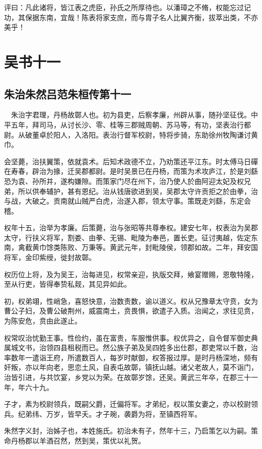 \documentclass[12pt,UTF8]{ctexbook}
\begin{document}
评曰：凡此诸将，皆江表之虎臣，孙氏之所厚待也。以潘璋之不脩，权能忘过记功，其保据东南，宜哉！陈表将家支庶，而与胄子名人比翼齐衡，拔萃出类，不亦美乎！

\part{吴书十一}
\chapter{朱治朱然吕范朱桓传第十一}

　朱治字君理，丹杨故鄣人也。初为县吏，后察孝廉，州辟从事，随孙坚征伐。中平五年，拜司马，从讨长沙、零、桂等三郡贼周朝、苏马等，有功，坚表治行都尉。从破董卓於阳人，入洛阳。表治行督军校尉，特将步骑，东助徐州牧陶谦讨黄巾。

会坚薨，治扶翼策，依就袁术。后知术政德不立，乃劝策还平江东。时太傅马日磾在寿春，辟治为掾，迁吴郡都尉。是时吴景已在丹杨，而策为术攻庐江，於是刘繇恐为袁、孙所并，遂构嫌隙。而策家门尽在州下，治乃使人於曲阿迎太妃及权兄弟，所以供奉辅护，甚有恩纪。治从钱唐欲进到吴，吴郡太守许贡拒之於由拳，治与战，大破之。贡南就山贼严白虎，治遂入郡，领太守事。策既走刘繇，东定会稽。

权年十五，治举为孝廉。后策薨，治与张昭等共尊奉权。建安七年，权表治为吴郡太守，行扶义将军，割娄、由拳、无锡、毗陵为奉邑，置长吏。征讨夷越，佐定东南，禽截黄巾馀类陈败、万秉等。黄武元年，封毗陵侯，领郡如故。二年，拜安国将军，金印紫绶，徙封故鄣。

权历位上将，及为吴王，治每进见，权常亲迎，执版交拜，飨宴赠赐，恩敬特隆，至从行吏，皆得奉贽私觌，其见异如此。

初，权弟翊，性峭急，喜怒快意，治数责数，谕以道义。权从兄豫章太守贲，女为曹公子妇，及曹公破荆州，威震南土，贲畏惧，欲遣子入质。治闻之，求往见贲，为陈安危，贲由此遂止。

权常叹治忧勤王事。性俭约，虽在富贵，车服惟供事。权优异之，自令督军御史典属城文书，治领四县租税而已。然公族子弟及吴四姓多出仕郡，郡吏常以千数，治率数年一遣诣王府，所遣数百人，每岁时献御，权答报过厚。是时丹杨深地，频有奸叛，亦以年向老，思恋土风，自表屯故鄣，镇抚山越。诸父老故人，莫不诣门，治皆引进，与共饮宴，乡党以为荣。在故鄣岁馀，还吴。黄武三年卒，在郡三十一年，年六十九。

子才，素为校尉领兵，既嗣父爵，迁偏将军。才弟纪，权以策女妻之，亦以校尉领兵。纪弟纬、万岁，皆早夭。才子琬，袭爵为将，至镇西将军。

朱然字义封，治姊子也，本姓施氏。初治未有子，然年十三，乃启策乞以为嗣。策命丹杨郡以羊酒召然，然到吴，策优以礼贺。
\end{document}
